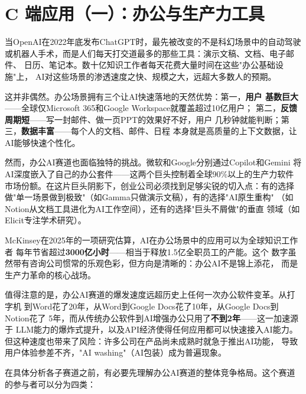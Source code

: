 
\chapter{C 端应用（一）：办公与生产力工具}
\label{ch:consumer-prod}


当OpenAI在2022年底发布ChatGPT时，最先被改变的不是科幻场景中的自动驾驶
或机器人手术，而是人们每天打交道最多的那些工具：演示文稿、文档、电子邮件、
日历、笔记本。数十亿知识工作者每天花费大量时间在这些"办公基础设施"上，
AI对这些场景的渗透速度之快、规模之大，远超大多数人的预期。

这并非偶然。办公场景拥有三个让AI快速落地的天然优势：第一，\textbf{用户
基数巨大}——全球仅Microsoft 365和Google Workspace就覆盖超过10亿用户；
第二，\textbf{反馈周期短}——写一封邮件、做一页PPT的效果好不好，用户
几秒钟就能判断；第三，\textbf{数据丰富}——每个人的文档、邮件、日程
本身就是高质量的上下文数据，让AI能够快速个性化。

然而，办公AI赛道也面临独特的挑战。微软和Google分别通过Copilot和Gemini
将AI深度嵌入了自己的办公套件——这两个巨头控制着全球90\%以上的生产力软件
市场份额。在这片巨头阴影下，创业公司必须找到足够尖锐的切入点：有的选择
做"单一场景做到极致"（如Gamma只做演示文稿），有的选择"AI原生重构"
（如Notion从文档工具进化为AI工作空间），还有的选择"巨头不屑做"的垂直
领域（如Elicit专注学术研究）。

McKinsey在2025年的一项研究估算，AI在办公场景中的应用可以为全球知识工作者
每年节省超过\textbf{3000亿小时}——相当于释放1.5亿全职员工的产能。这个
数字虽然带有咨询公司惯常的乐观色彩，但方向是清晰的：办公AI不是锦上添花，
而是生产力革命的核心战场。

值得注意的是，办公AI赛道的爆发速度远超历史上任何一次办公软件变革。从打字机
到Word花了20年，从Word到Google Docs花了10年，从Google Docs到Notion花了
5年，而从传统办公软件到AI增强办公只用了\textbf{不到2年}——这一加速源于
LLM能力的爆炸式提升，以及API经济使得任何应用都可以快速接入AI能力。
但这种速度也带来了风险：许多公司在产品尚未成熟时就急于推出AI功能，
导致用户体验参差不齐，"AI washing"（AI包装）成为普遍现象。

在具体分析各子赛道之前，有必要先理解办公AI赛道的整体竞争格局。这个赛道
的参与者可以分为四类：

